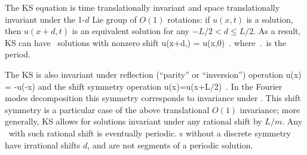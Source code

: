 

The KS equation   is
time translationally invariant
and 
space translationally invariant
under the 1-$d$ Lie group of $O(1)$ rotations: if
$u(x,t)$ is a solution, then $u(x+d,t)$ is an equivalent
solution for any $-L/2 < d \leq L/2$.
As a result,
KS can have \rpo\ solutions with nonzero shift
\beq
u(x+d,\period{}) = u(x,0)
\,.
where $\period{}$ is the period.

The KS is also invariant under
reflection (``parity'' or ``inversion'') operation
\beq
\Refl u(x) = -u(-x)
and the shift symmetry operation 
\beq
\Shift u(x)=u(x+L/2)
\,. 
In the Fourier modes decomposition  this
symmetry corresponds to invariance under
.
This shift symmetry is a particular case of the
above translational $O(1)$ invariance; more generally,
KS allows for solutions invariant under any rational shift by
$L/m$. Any \rpo\ with such rational shift is eventually periodic.
\Rpo s without a discrete symmetry have irrational shifts
$d$, and are not segments of a periodic solution.


